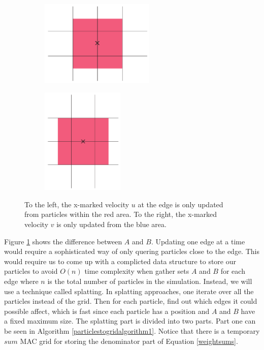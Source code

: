 \begin{figure}[ht!]
\centering
\begin{subfigure}[b]{0.3\textwidth}
\includegraphics[height=41mm]{img/areau.pdf}
\end{subfigure}
\begin{subfigure}[b]{0.3\textwidth}
\includegraphics[height=51mm]{img/areav.pdf}
\end{subfigure}
\caption{To the left, the x-marked velocity $u$ at the edge is only updated from particles within the red area. To the right, the x-marked velocity $v$ is only updated from the blue area.}
\label{areaa}
\end{figure}

Figure \ref{areaa} shows the difference between $A$ and $B$. Updating one edge at a time would require a sophisticated way of only quering particles close to the edge. This would require us to come up with a complicted data structure to store our particles to avoid $O(n)$ time complexity when gather sets $A$ and $B$ for each edge where $n$ is the total number of particles in the simulation. Instead, we will use a technique called splatting. In splatting approaches, one iterate over all the particles instead of the grid. Then for each particle, find out which edges it could possible affect, which is fast since each particle has a position and $A$ and $B$ have a fixed maximum size. The splatting part is divided into two parts. Part one can be seen in Algorithm \ref{particlestogridalgorithm1}. Notice that there is a temporary $sum$ MAC grid for storing the denominator part of Equation \ref{weightsums}.

